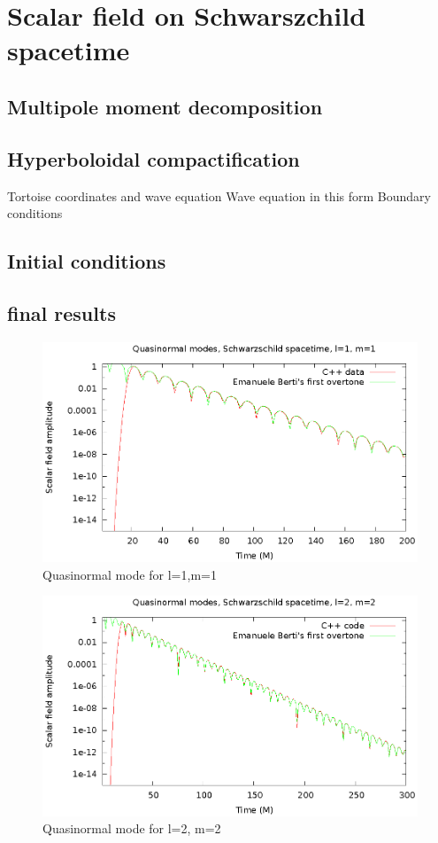 \section{Scalar field on Schwarszchild spacetime}




\subsection{Multipole moment decomposition}
\subsection{Hyperboloidal compactification}
Tortoise coordinates and wave equation
Wave equation in this form
Boundary conditions
\subsection{Initial conditions}
\subsection{final results}


\begin{figure}
  \includegraphics{l1m1qnm}
  \caption{Quasinormal mode for l=1,m=1}
  \end{figure}

\begin{figure}
  \includegraphics{l2m2qnm}
  \caption{Quasinormal mode for l=2, m=2}
\end{figure}


